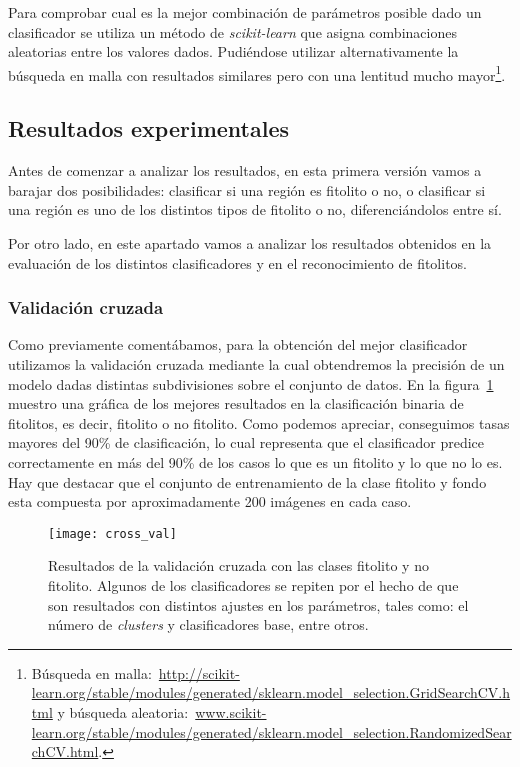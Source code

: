 Para comprobar cual es la mejor combinación de parámetros posible dado un clasificador se utiliza un método de \textit{scikit-learn} que asigna combinaciones aleatorias entre los valores dados. Pudiéndose utilizar alternativamente la búsqueda en malla con resultados similares pero con una lentitud mucho mayor\footnote{Búsqueda en malla:~\url{http://scikit-learn.org/stable/modules/generated/sklearn.model_selection.GridSearchCV.html} y búsqueda aleatoria:~\url{www.scikit-learn.org/stable/modules/generated/sklearn.model_selection.RandomizedSearchCV.html}.}.

\subsection{Resultados experimentales}

Antes de comenzar a analizar los resultados, en esta primera versión vamos a barajar dos posibilidades: clasificar si una región es fitolito o no, o clasificar si una región es uno de los distintos tipos de fitolito o no, diferenciándolos entre sí. 

Por otro lado, en este apartado vamos a analizar los resultados obtenidos en la evaluación de los distintos clasificadores y en el reconocimiento de fitolitos.

\subsubsection{Validación cruzada}

Como previamente comentábamos, para la obtención del mejor clasificador utilizamos la validación cruzada mediante la cual obtendremos la precisión de un modelo dadas distintas subdivisiones sobre el conjunto de datos. En la figura~\ref{fig:cross_val} muestro una gráfica de los mejores resultados en la clasificación binaria de fitolitos, es decir, fitolito o no fitolito. Como podemos apreciar, conseguimos tasas mayores del 90\% de clasificación, lo cual representa que el clasificador predice correctamente en más del 90\% de los casos lo que es un fitolito y lo que no lo es. Hay que destacar que el conjunto de entrenamiento de la clase fitolito y fondo esta compuesta por aproximadamente 200 imágenes en cada caso. 

\begin{figure}
\centering
\texttt{[image: cross\_val]}
\caption[Resultados de la validación cruzada con las clases fitolito y no fitolito]{Resultados de la validación cruzada con las clases fitolito y no fitolito. Algunos de los clasificadores se repiten por el hecho de que son resultados con distintos ajustes en los parámetros, tales como: el número de \textit{clusters} y clasificadores base, entre otros.}
\label{fig:cross_val}
\end{figure}

